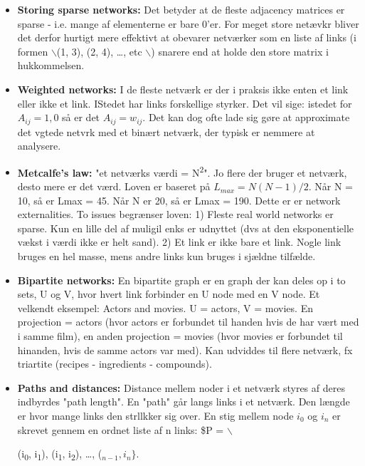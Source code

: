 \documentclass[11pt]{article}
\begin{document}
\begin{itemize}
\item \textbf{Storing sparse networks:} Det betyder at de fleste adjacency matrices er sparse - i.e. mange af elementerne er bare 0'er. For meget store netævkr bliver det derfor hurtigt mere effektivt at obevarer netværker som en liste af links (i formen $\backslash${(1, 3), (2, 4), \ldots{}, etc $\backslash$}) snarere end at holde den store matrix i hukkommelsen.

\item \textbf{Weighted networks:} I de fleste netværk er der i praksis ikke enten et link eller ikke et link. IStedet har links forskellige styrker. Det vil sige: istedet for \(A_{ij} = 1,0\) så er det \(A_{ij} = w_{ij}\). Det kan dog ofte lade sig gøre at approximate det vgtede netvrk med et binært netværk, der typisk er nemmere at analysere.

\item \textbf{Metcalfe's law:} "et netværks værdi = N\textsuperscript{2}". Jo flere der bruger et netværk, desto mere er det værd. Loven er baseret på \(L_{max} = N(N-1) / 2\). Når N = 10, så er Lmax = 45. Når N er 20, så er Lmax = 190. Dette er er network externalities. To issues begrænser loven: 1) Fleste real world networks er sparse. Kun en lille del af muligil enks er udnyttet (dvs at den eksponentielle vækst i værdi ikke er helt sand). 2) Et link er ikke bare et link. Nogle link bruges en hel masse, mens andre links kun bruges i sjældne tilfælde.

\item \textbf{Bipartite networks:}  En bipartite graph er en graph der kan deles op i to sets, U og V, hvor hvert link forbinder en U node med en V node. Et velkendt eksempel: Actors and movies. U = actors, V = movies. En projection = actors (hvor actors er forbundet til handen hvis de har vært med i samme film), en anden projection = movies (hvor movies er forbundet til hinanden, hvis de samme actors var med). Kan udviddes til flere netværk, fx triartite (recipes - ingredients - compounds).

\item \textbf{Paths and distances:} Distance mellem noder i et netværk styres af deres indbyrdes "path length". En "path" går langs links i et netværk. Den længde er hvor mange links den strllkker sig over. En stig mellem node \(i_0\) og \(i_n\) er skrevet gennem en ordnet liste af n links: \$P = $\backslash${ (i\textsubscript{0}, i\textsubscript{1}), (i\textsubscript{1}, i\textsubscript{2}), \ldots{}, (\(_{n - 1}, i_n \}\).

}
\end{itemize}
\end{document}
